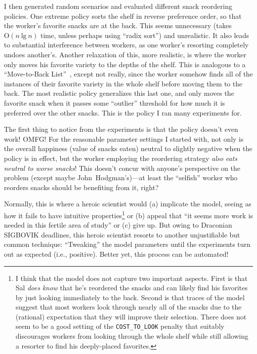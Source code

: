 \documentclass[twocolumn]{article}
\begin{document}
I then generated random scenarios and evaluated different snack
reordering policies. One extreme policy sorts the shelf in reverse
preference order, so that the worker's favorite snacks are at the
back. This seems unnecessary (takes $\mathrm{O}(n\ \mathrm{lg}\ n)$
time, unless perhaps using ``radix sort'') and unrealistic. It also
leads to substantial interference between workers, as one worker's
resorting completely undoes another's. Another relaxation of this,
more realistic, is where the worker only moves his favorite variety to
the depths of the shelf. This is analogous to a ``Move-to-Back
List''~\cite{rivest1976self}, except not really, since the worker
somehow finds all of the instances of their favorite variety in the
whole shelf before moving them to the back. The most realistic policy
generalizes this last one, and only moves the favorite snack when it
passes some ``outlier'' threshold for how much it is preferred over
the other snacks. This is the policy I ran many experiments for.

\medskip
The first thing to notice from the experiments is that the policy
doesn't even work! OMFG! For the reasonable parameter settings I
started with, not only is the overall happiness (value of snacks
eaten) neutral to slightly negative when the policy is in effect,
but the worker employing the reordering strategy \emph{also eats
  neutral to worse snacks}! This doesn't concur with anyone's
perspective on the problem (except maybe John~Hodgman's)---at least
the ``selfish'' worker who reorders snacks should be benefiting
from it, right?

Normally, this is where a heroic scientist would (a) implicate the
model, seeing as how it fails to have intuitive properties\footnote{I
  think that the model does not capture two important aspects. First
  is that Sal \emph{does know} that he's reordered the snacks and can
  likely find his favorites by just looking immediately to the back.
  Second is that traces of the model suggest that most workers look
  through nearly all of the snacks due to the (rational) expectation
  that they will improve their selection. There does not seem to be a
  good setting of the {\tt COST\_TO\_LOOK} penalty that suitably
  discourages workers from looking through the whole shelf while still
  allowing a resorter to find his deeply-placed favorites.} or (b)
appeal that ``it seems more work is needed in this fertile area of
study'' or (c) give up. But owing to Draconian SIGBOVIK deadlines,
this heroic scientist resorts to another unjustifiable but common
technique: ``Tweaking'' the model parameters until the experiments
turn out as expected (i.e., positive). Better yet, this process can be
automated!
\end{document}
